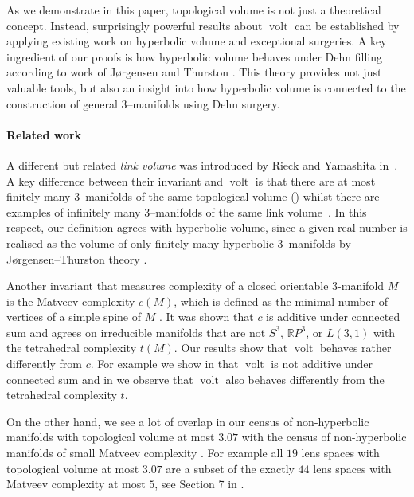 \documentclass[a4paper]{gtart}
\theoremstyle{definition}
\theoremstyle{remark}
\numberwithin{equation}{section}
\newcommand{\R}{\mathbb{R}}
\DeclareMathOperator{\volt}{volt}
\begin{document}
As we demonstrate in this paper, topological volume is not just a theoretical concept. Instead, surprisingly powerful results about $\volt$ can be established by applying existing work on hyperbolic volume and exceptional surgeries. A key ingredient of our proofs is how hyperbolic volume behaves under Dehn filling according to work of J\o{}rgensen and Thurston \cite{thurston-notes,Gro81, Mai10}. This theory provides not just valuable tools, but also an insight into how hyperbolic volume is connected to the construction of general $3$--manifolds using Dehn surgery.

\paragraph{Related work}
A different but related \emph{link volume} was introduced by Rieck and Yamashita in~\cite{Rieck-link-2013}. A key difference between their invariant and $\volt$ is that there are at most finitely many 3--manifolds of the same topological volume () whilst there are examples of infinitely many 3--manifolds of the same link volume~\cite[Corollary 1.2]{Remigio-link-2012}. In this respect, our definition agrees with hyperbolic volume, since a given real number is realised as the volume of only finitely many hyperbolic 3--manifolds by J\o{}rgensen--Thurston theory \cite{thurston-notes,Gro81, Mai10}.

Another invariant that measures complexity of a closed orientable $3$-manifold $M$ is the Matveev complexity $c(M)$, which is defined as the
minimal number of vertices of a simple spine of $M$ \cite{Matveev}. It was shown that $c$ is additive under connected sum and agrees on irreducible manifolds that are not $S^3$, $\R P^3$, or $L(3,1)$ with the tetrahedral complexity $t(M)$. Our results show that $\volt$ behaves rather differently from $c$. For example we show in  that $\volt$ is not additive under connected sum and in  we observe that $\volt$ also behaves differently from the tetrahedral complexity $t$. 

On the other hand, we see a lot of overlap in our census of non-hyperbolic manifolds with topological volume at most $3.07$ with the census of non-hyperbolic manifolds of small Matveev complexity \cite{Matveev,complexity_census0,complexity_census}. For example all $19$ lens spaces with topological volume at most $3.07$ are a subset of the exactly $44$ lens spaces with Matveev complexity at most $5$, see Section 7 in \cite{complexity_census}.
\end{document}

